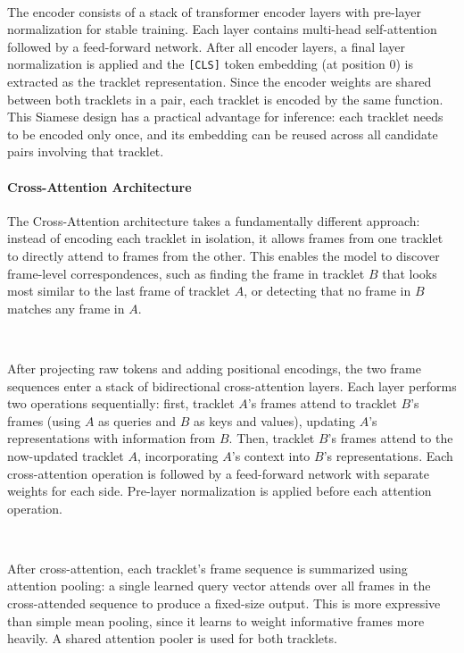 \

The encoder consists of a stack of transformer encoder layers with pre-layer normalization for stable training. Each layer contains multi-head self-attention followed by a feed-forward network. After all encoder layers, a final layer normalization is applied and the \texttt{[CLS]} token embedding (at position 0) is extracted as the tracklet representation. Since the encoder weights are shared between both tracklets in a pair, each tracklet is encoded by the same function. This Siamese design has a practical advantage for inference: each tracklet needs to be encoded only once, and its embedding can be reused across all candidate pairs involving that tracklet.


\paragraph{Cross-Attention Architecture}\label{par:cross_attention}
The Cross-Attention architecture takes a fundamentally different approach: instead of encoding each tracklet in isolation, it allows frames from one tracklet to directly attend to frames from the other. This enables the model to discover frame-level correspondences, such as finding the frame in tracklet $B$ that looks most similar to the last frame of tracklet $A$, or detecting that no frame in $B$ matches any frame in $A$.

\

After projecting raw tokens and adding positional encodings, the two frame sequences enter a stack of bidirectional cross-attention layers. Each layer performs two operations sequentially: first, tracklet $A$'s frames attend to tracklet $B$'s frames (using $A$ as queries and $B$ as keys and values), updating $A$'s representations with information from $B$. Then, tracklet $B$'s frames attend to the now-updated tracklet $A$, incorporating $A$'s context into $B$'s representations. Each cross-attention operation is followed by a feed-forward network with separate weights for each side. Pre-layer normalization is applied before each attention operation.

\

After cross-attention, each tracklet's frame sequence is summarized using attention pooling: a single learned query vector attends over all frames in the cross-attended sequence to produce a fixed-size output. This is more expressive than simple mean pooling, since it learns to weight informative frames more heavily. A shared attention pooler is used for both tracklets.


